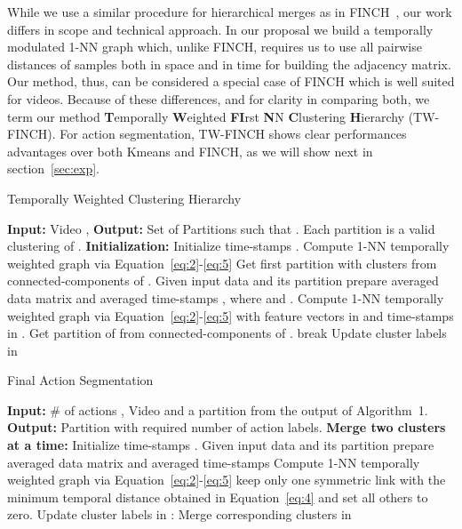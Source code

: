 \documentclass[10pt,twocolumn,letterpaper]{article}
\begin{document}
While we use a similar procedure for hierarchical merges as in FINCH~\cite{finch}, our work differs in scope and technical approach.
In our proposal we build a temporally modulated 1-NN graph which, unlike FINCH, requires us to use all pairwise distances of samples both in space and in time for building the adjacency matrix. Our method, thus, can be considered a special case of FINCH which is well suited for videos. Because of these differences, and for clarity in comparing both, we term our method \textbf{T}emporally \textbf{W}eighted \textbf{FI}rst \textbf{N}N \textbf{C}lustering \textbf{H}ierarchy (TW-FINCH). For action segmentation, TW-FINCH shows clear performances advantages over both Kmeans and FINCH, as we will show next in section~\ref{sec:exp}.

\begin{algorithm}[t]
\caption{Temporally Weighted Clustering Hierarchy}\label{algo:the_alg}
\begin{algorithmic}[1]
\STATE \textbf{Input:} Video ,  \STATE \textbf{Output:} Set of Partitions  such that  . Each partition  is a valid clustering of . \STATE \textbf{Initialization:}
\STATE Initialize time-stamps . Compute 1-NN temporally weighted graph   via Equation~\ref{eq:2}-\ref{eq:5} \label{algo:line4}
\STATE  Get first partition  with  clusters from connected-components of   . \label{algo:line5}
\STATE  Given input data  and its partition  prepare averaged data matrix  and averaged time-stamps  , where    and . 
\STATE Compute 1-NN temporally weighted graph   via Equation~\ref{eq:2}-\ref{eq:5} with feature vectors in  and time-stamps in .
\STATE Get partition  of  from connected-components of .
\STATE break
\ELSE
\STATE Update cluster labels in 
\ENDIF 
\ENDWHILE
\end{algorithmic}
\end{algorithm}



\begin{algorithm}[t]
\caption{Final Action Segmentation}\label{algo:the_alg2} 
\begin{algorithmic}[1]
\STATE \textbf{Input:} \# of actions , Video  and a partition  from the output of Algorithm~1.
\STATE \textbf{Output:} Partition  with required number of action labels.
\STATE \textbf{Merge two clusters at a time:}
\STATE  Initialize time-stamps . Given input data  and its partition  prepare averaged data matrix  and averaged time-stamps 
\STATE Compute 1-NN temporally weighted graph   via Equation~\ref{eq:2}-\ref{eq:5}
\STATE   keep only one symmetric link  with the minimum temporal distance  obtained in Equation~\ref{eq:4} and set all others to zero. 
\STATE  Update cluster labels in : Merge corresponding  clusters in 
\ENDFOR
\end{algorithmic}

\end{algorithm}
\end{document}
